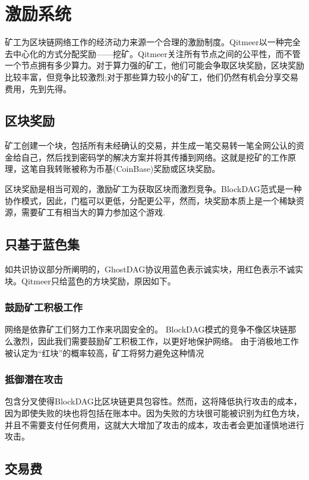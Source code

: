 \documentclass[a4paper,11pt]{article}
\begin{document}
\section{激励系统}

矿工为区块链网络工作的经济动力来源一个合理的激励制度。Qitmeer以一种完全去中心化的方式分配奖励——挖矿。Qitmeer关注所有节点之间的公平性，而不管一个节点拥有多少算力。对于算力强的矿工，他们可能会争取区块奖励，区块奖励比较丰富，但竞争比较激烈;对于那些算力较小的矿工，他们仍然有机会分享交易费用，先到先得。

\subsection{区块奖励}
矿工创建一个块，包括所有未经确认的交易，并生成一笔交易转一笔全网公认的资金给自己，然后找到密码学的解决方案并将其传播到网络。这就是挖矿的工作原理，这笔自我转账被称为币基(CoinBase)奖励或区块奖励。

区块奖励是相当可观的，激励矿工为获取区块而激烈竞争。BlockDAG范式是一种协作模式，因此，门槛可以更低，分配更公平，然而，块奖励本质上是一个稀缺资源，需要矿工有相当大的算力参加这个游戏. 

\subsection*{只基于蓝色集}
如共识协议部分所阐明的，GhostDAG协议用蓝色表示诚实块，用红色表示不诚实块。Qitmeer只给蓝色的方块奖励，原因如下。

\subsubsection*{鼓励矿工积极工作}
网络是依靠矿工们努力工作来巩固安全的。
BlockDAG模式的竞争不像区块链那么激烈，因此我们需要鼓励矿工积极工作，以更好地保护网络。
由于消极地工作被认定为“红块”的概率较高，矿工将努力避免这种情况

\subsubsection*{抵御潜在攻击}
包含分叉使得BlockDAG比区块链更具包容性。然而，这将降低执行攻击的成本，因为即使失败的块也将包括在账本中。因为失败的方块很可能被识别为红色方块，并且不需要支付任何费用，这就大大增加了攻击的成本，攻击者会更加谨慎地进行攻击。

\subsection{交易费}
\end{document}
